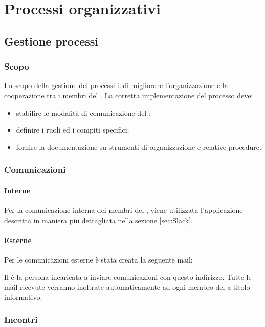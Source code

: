 \section{Processi organizzativi}
    \subsection{Gestione processi}
		\subsubsection{Scopo}
		Lo scopo della gestione dei processi è di migliorare l'organizzazione e la cooperazione tra i membri del . La corretta implementazione del processo deve:
		\begin{itemize}
			\item stabilire le modalità di comunicazione del ;
			\item definire i ruoli ed i compiti specifici;
			\item fornire la documentazione su strumenti di organizzazione e relative procedure.
		\end{itemize}
        \subsubsection{Comunicazioni}
            \paragraph{Interne}
                Per la comunicazione interna dei membri del , viene utilizzata l'applicazione  descritta in maniera piu dettagliata nella sezione \ref{sec:Slack}.
            \paragraph{Esterne}
				Per le comunicazioni esterne è stata creata la seguente mail:
				\begin{center}
					\mailzep
				\end{center}
				Il \responsabilediprogetto{} è la persona incaricata a inviare comunicazioni con questo indirizzo. Tutte le mail ricevute verranno inoltrate automaticamente ad ogni membro del  a titolo informativo.
        \subsubsection{Incontri}
